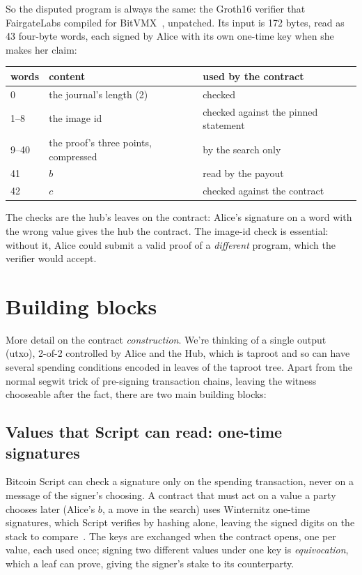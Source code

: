 \documentclass[11pt]{article}
\begin{document}
So the disputed program is always the same: the Groth16 verifier that
FairgateLabs compiled for BitVMX~\cite{bitvmxcpu}, unpatched. Its input is 172 bytes, read as 43
four-byte words, each signed by Alice with its own one-time key when she
makes her claim:
\begin{center}
\small
\begin{tabular}{lll}
\toprule
words & content & used by the contract \\
\midrule
0 & the journal's length (2) & checked \\
1--8 & the image id & checked against the pinned statement \\
9--40 & the proof's three points\footnotemark , compressed & by the search only \\
41 & $b$ & read by the payout \\
42 & $c$ & checked against the contract \\
\bottomrule
\end{tabular}
\end{center}

The checks are the hub's leaves on the contract: Alice's signature on a
word with the wrong value gives the hub the contract. The image-id check
is essential: without it, Alice could submit a valid proof of a
\emph{different} program, which the verifier would accept.

\section{Building blocks}
\label{sec:blocks}

More detail on the contract \emph{construction}. We're thinking of a single output (utxo), 2-of-2 controlled by Alice and the Hub, which is taproot and so can have several spending conditions encoded in leaves of the taproot tree. Apart from the normal segwit trick of pre-signing transaction chains, leaving the witness chooseable after the fact, there are two main building blocks:

\subsection{Values that Script can read: one-time signatures}

Bitcoin Script can check a signature only on the spending transaction,
never on a message of the signer's choosing. A contract that must act on
a value a party chooses later (Alice's $b$, a move in the search) uses
Winternitz one-time signatures, which Script verifies by hashing alone,
leaving the signed digits on the stack to compare~\cite{bitvm,bitvmx}. The
keys are exchanged when the contract opens, one per value, each used
once; signing two different values under one key is
\emph{equivocation}, which a leaf can prove, giving the signer's stake
to its counterparty.
\end{document}
